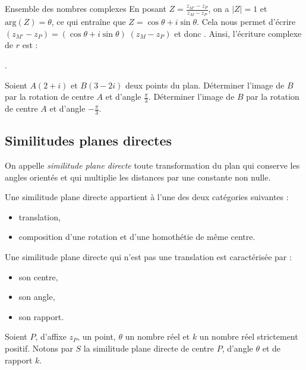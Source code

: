 \begin{chapter}{Ensemble des nombres complexes}
En posant $Z = \frac{z_{M'} - z_P}{z_M - z_P}$, on a $|Z| = 1$ et $\text{arg} (Z) = \theta$, ce qui entra\^ine que 
$Z = \cos \theta + i \sin \theta$. 
Cela nous permet d'\'ecrire $( z_{M'} - z_P ) = ( \cos \theta + i \sin \theta) \; ( z_M - z_P )$ et donc 
.
Ainsi, l'\'ecriture complexe de $r$ est : 
\begin{center}
.
\end{center}
%
\begin{exe}
\label{exe:rotation}
Soient $A (2 + i ) $ et $B (3 - 2 i)$ deux points du plan. 
D\'eterminer l'image de $B$ par la rotation de centre $A$ et d'angle $\frac{\pi}{3}$.
D\'eterminer l'image de $B$ par la rotation de centre $A$ et d'angle $-\frac{\pi}{3}$.
\end{exe}
%
\subsection{Similitudes planes directes}
      \begin{defi}
      On appelle \emph{similitude plane directe} toute transformation du plan qui conserve les angles orient\'es
      et qui multiplie les distances par une constante non nulle.
      \end{defi}
      \begin{thm}
      Une similitude plane directe appartient \`a l'une des deux cat\'egories suivantes :
            \begin{itemize}
                  \item translation,
                  \item composition d'une rotation et d'une homoth\'etie de m\^eme centre.
            \end{itemize}
      \end{thm}
      \begin{prop}
      Une similitude plane directe qui n'est pas une translation est caract\'eris\'ee par : 
            \begin{itemize}
                  \item son centre,
                  \item son angle,
                  \item son rapport.
            \end{itemize}
      \end{prop}
      \begin{prop}
            Soient $P$, d'affixe $z_P$, un point, $\theta$ un nombre r\'eel et $k$ un nombre r\'eel strictement positif.
            Notons par $S$ la similitude plane directe de centre $P$, d'angle $\theta$ et de rapport $k$.
            

\end{prop}
\end{chapter}
